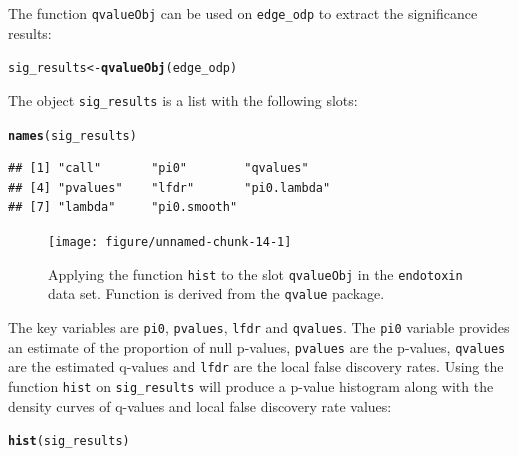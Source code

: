 \documentclass{article}\usepackage[]{graphicx}\usepackage[]{color}
\makeatletter
\newcommand{\hlstd}[1]{\textcolor[rgb]{0.345,0.345,0.345}{#1}}%
\newcommand{\hlkwb}[1]{\textcolor[rgb]{0.69,0.353,0.396}{#1}}%
\newcommand{\hlkwd}[1]{\textcolor[rgb]{0.737,0.353,0.396}{\textbf{#1}}}%
\newenvironment{kframe}{%
 \def\at@end@of@kframe{}%
 \ifinner\ifhmode%
  \def\at@end@of@kframe{\end{minipage}}%
  \begin{minipage}{\columnwidth}%
 \fi\fi%
 \def\FrameCommand##1{\hskip\@totalleftmargin \hskip-\fboxsep
 \colorbox{shadecolor}{##1}\hskip-\fboxsep
     \hskip-\linewidth \hskip-\@totalleftmargin \hskip\columnwidth}%
 \MakeFramed {\advance\hsize-\width
   \@totalleftmargin\z@ \linewidth\hsize
   \@setminipage}}%
 {\par\unskip\endMakeFramed%
 \at@end@of@kframe}
\newenvironment{knitrout}{}{} %
\makeatother
\begin{document}
The function {\tt qvalueObj} can be used on {\tt edge\_odp} to extract the significance results:
\begin{knitrout}
\color{fgcolor}\begin{kframe}
\begin{alltt}
\hlstd{sig_results} \hlkwb{<-} \hlkwd{qvalueObj}\hlstd{(edge_odp)}
\end{alltt}
\end{kframe}
\end{knitrout}

The object {\tt sig\_results} is a list with the following slots:
\begin{knitrout}
\color{fgcolor}\begin{kframe}
\begin{alltt}
\hlkwd{names}\hlstd{(sig_results)}
\end{alltt}
\begin{verbatim}
## [1] "call"       "pi0"        "qvalues"   
## [4] "pvalues"    "lfdr"       "pi0.lambda"
## [7] "lambda"     "pi0.smooth"
\end{verbatim}
\end{kframe}
\end{knitrout}
\begin{figure}[t]
 \centering
\begin{knitrout}
\color{fgcolor}

{\centering \texttt{[image: figure/unnamed-chunk-14-1]} 

}



\end{knitrout}
\caption{Applying the function {\tt hist} to the slot {\tt qvalueObj} in the {\tt endotoxin} data set. Function is derived from the {\tt qvalue} package.}
\label{fig:eqvalHist}
\end{figure}

The key variables are {\tt pi0}, {\tt pvalues}, {\tt lfdr} and {\tt qvalues}. The {\tt pi0} variable provides an estimate of the proportion of null p-values, {\tt pvalues} are the p-values, {\tt qvalues} are the estimated q-values and {\tt lfdr} are the local false discovery rates. Using the function {\tt hist} on {\tt sig\_results} will produce a p-value histogram along with the density curves of q-values and local false discovery rate values:
\begin{knitrout}
\color{fgcolor}\begin{kframe}
\begin{alltt}
\hlkwd{hist}\hlstd{(sig_results)}
\end{alltt}
\end{kframe}
\end{knitrout}
\end{document}
